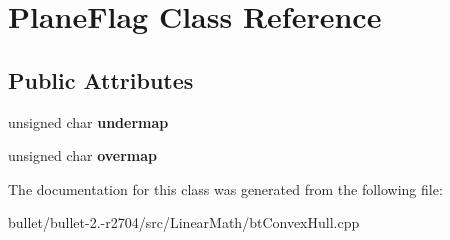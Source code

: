 \hypertarget{class_plane_flag}{\section{Plane\+Flag Class Reference}
\label{class_plane_flag}
}
\subsection*{Public Attributes}
\begin{DoxyCompactItemize}
\item 
\hypertarget{class_plane_flag_a3c4bbb24542a57277d7ec002b1b76b9c}{unsigned char {\bfseries undermap}}\label{class_plane_flag_a3c4bbb24542a57277d7ec002b1b76b9c}

\item 
\hypertarget{class_plane_flag_a2c0042d0e6b50e2652542500997c5841}{unsigned char {\bfseries overmap}}\label{class_plane_flag_a2c0042d0e6b50e2652542500997c5841}

\end{DoxyCompactItemize}


The documentation for this class was generated from the following file\+:\begin{DoxyCompactItemize}
\item 
bullet/bullet-\/2.-\/r2704/src/\+Linear\+Math/bt\+Convex\+Hull.\+cpp\end{DoxyCompactItemize}
